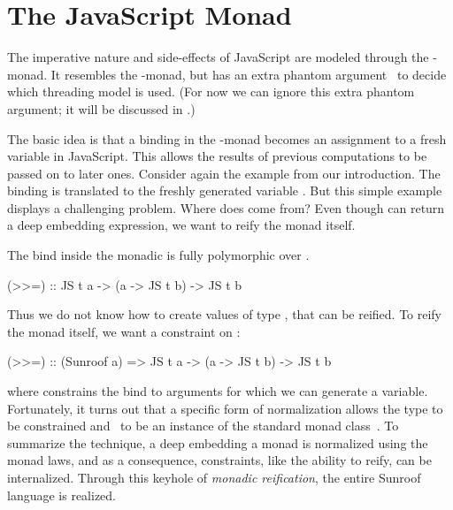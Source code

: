  
\section{The JavaScript Monad}
\label{sec:js-monad}

The imperative nature and side-effects of JavaScript are 
modeled through the \JS-monad. It resembles the \IO-monad, 
but has an extra phantom argument~\cite{Leijen:99:Phantom} 
to decide which threading model is used. 
(For now we can ignore this extra phantom argument; it will be
discussed in .)

The basic idea is that a binding in the \JS-monad becomes an
assignment to a fresh variable in JavaScript. 
This allows the results of previous computations to be passed on to 
later ones.
Consider again the example from our introduction.
The binding  is translated to the freshly generated
variable .
But this simple example displays a challenging problem. Where does
 come from? Even though  can return a deep embedding 
expression, we want to reify the monad itself.

The bind inside the monadic  is
fully polymorphic over .
\begin{Code}
(>>=) :: JS t a -> (a -> JS t b) -> JS t b
\end{Code}
Thus we do not know how to create values of type ,
that can be reified.
To reify the monad itself, we want a constraint on :
\begin{Code}
(>>=) :: (Sunroof a) => JS t a -> (a -> JS t b) -> JS t b
\end{Code}
where  constrains the bind to
arguments for which we can generate a variable.
Fortunately, it turns out that a specific form of normalization allows 
the type  to be constrained and \JS~to 
be an instance of the standard monad class~\cite{Sculthorpe:13:ConstrainedMonads}.
To summarize the technique, a deep embedding a monad is normalized using the monad laws,
and as a consequence, constraints, like the ability to reify, can be internalized.
Through this keyhole of {\em monadic reification},
the entire Sunroof language is realized.

